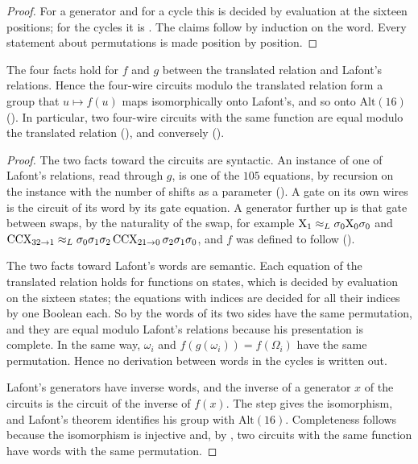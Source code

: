 \documentclass[acmsmall,screen,nonacm]{acmart}
\begin{document}
\begin{proof}
For a generator and for a cycle this is decided by evaluation at the sixteen positions; for the cycles it is . The claims follow by induction on the word. Every statement about permutations is made position by position.
\end{proof}

\begin{proposition}\label{prop:x-first}
The four facts hold for $f$ and $g$ between the translated relation and Lafont's relations. Hence the four-wire circuits modulo the translated relation form a group that $u\mapsto f(u)$ maps isomorphically onto Lafont's, and so onto $\mathrm{Alt}(16)$ \textup{()}. In particular, two four-wire circuits with the same function are equal modulo the translated relation \textup{()}, and conversely \textup{()}.
\end{proposition}

\begin{proof}
The two facts toward the circuits are syntactic. An instance of one of Lafont's relations, read through $g$, is one of the $105$ equations, by recursion on the instance with the number of shifts as a parameter \textup{()}. A gate on its own wires is the circuit of its word by its gate equation. A generator further up is that gate between swaps, by the naturality of the swap, for example $\mathrm{X}_1\approx_L\sigma_0\mathrm{X}_0\sigma_0$ and $\mathrm{CCX}_{32\to1}\approx_L\sigma_0\sigma_1\sigma_2\,\mathrm{CCX}_{21\to0}\,\sigma_2\sigma_1\sigma_0$, and $f$ was defined to follow \textup{()}.

The two facts toward Lafont's words are semantic. Each equation of the translated relation holds for functions on states, which is decided by evaluation on the sixteen states; the equations with indices are decided for all their indices by one Boolean each. So by  the words of its two sides have the same permutation, and they are equal modulo Lafont's relations because his presentation is complete. In the same way, $\omega_i$ and $f(g(\omega_i))=f(\Omega_i)$ have the same permutation. Hence no derivation between words in the cycles is written out.

Lafont's generators have inverse words, and the inverse of a generator $x$ of the circuits is the circuit of the inverse of $f(x)$. The step gives the isomorphism, and Lafont's theorem identifies his group with $\mathrm{Alt}(16)$. Completeness follows because the isomorphism is injective and, by , two circuits with the same function have words with the same permutation.
\end{proof}
\end{document}
